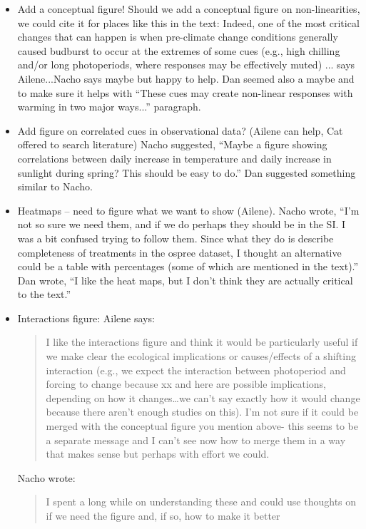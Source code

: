 \documentclass[11pt,letterpaper]{article}
\begin{document}
\begin{itemize} %
\item Add a conceptual figure! Should we add a conceptual figure on non-linearities, we could cite
it for places like this in the text: Indeed, one of the most critical
changes that can happen is when pre-climate change conditions generally
caused budburst to occur at the extremes of some cues (e.g., high
chilling and/or long photoperiods, where responses may be effectively muted) ... says Ailene...Nacho says maybe but happy to help. Dan seemed also a maybe and to make sure it helps with ``These cues may create non-linear responses with warming in two major ways...'' paragraph.
\item Add figure on correlated cues in observational data? (Ailene can help, Cat offered to search literature) Nacho suggested, ``Maybe a figure showing correlations between daily increase in temperature and daily increase in sunlight during spring? This should be easy to do.'' Dan suggested something similar to Nacho.
\item Heatmaps -- need to figure what we want to show (Ailene). Nacho wrote, ``I'm not so sure we need them, and if we do perhaps they should be in the SI. I was a bit confused trying to follow them. Since what they do is describe completeness of treatments in the ospree dataset, I thought an alternative could be a table with percentages (some of which are mentioned in the text).'' Dan wrote, ``I like the heat maps, but I don’t think they are actually critical to the text.''
\item Interactions figure: Ailene says:
\begin{quote}
I like the interactions figure and think it would be particularly useful if we make clear the ecological implications or causes/effects of a shifting interaction (e.g., we expect the interaction between photoperiod and forcing to change because xx and here are possible implications, depending on how it changes…we can’t say exactly how it would change because there aren’t enough studies on this). I’m not sure if it could be merged with the conceptual figure you mention above- this seems to be a separate message and I can’t see now how to merge them in a way that makes sense but perhaps with effort we could.
\end{quote}
 Nacho wrote:
\begin{quote}
I spent a long while on understanding these and could 
use thoughts on if we need the figure and, if so, how to make it better 

\end{quote}
\end{itemize}
\end{document}

